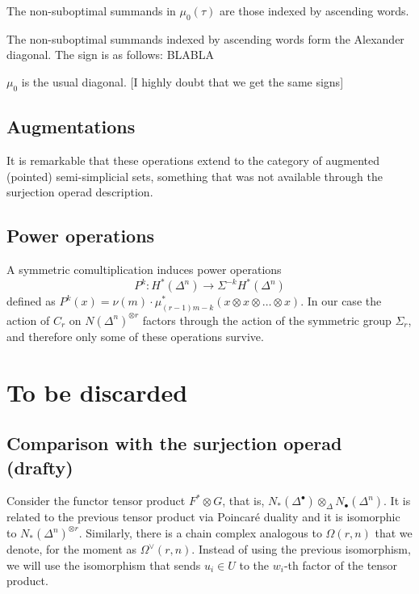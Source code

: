 \begin{proposition}
    The non-suboptimal summands in $\mu_0(\tau)$ are those indexed by ascending words.
\end{proposition}
\begin{proposition}
    The non-suboptimal summands indexed by ascending words form the Alexander diagonal. The sign is as follows: BLABLA 
\end{proposition}
\begin{corollary}
    $\mu_0$ is the usual diagonal. [I highly doubt that we get the same signs]
\end{corollary}




\subsection{Augmentations} It is remarkable that these operations extend to the category of augmented (pointed) semi-simplicial sets, something that was not available through the surjection operad description.  

\subsection{Power operations} A symmetric comultiplication induces power operations 
\[P^k\colon H^*(\Delta^n)\to \Sigma^{-k} H^*(\Delta^n)\]
defined as $P^k(x) =\nu(m)\cdot \mu_{(r-1)m-k}^*(x\otimes x\otimes\ldots\otimes x)$. In our case the action of $C_r$ on $N(\Delta^n)^{\otimes r}$ factors through the action of the symmetric group $\Sigma_r$, and therefore only some of these operations survive. 

\section{To be discarded}
\subsection{Comparison with the surjection operad (drafty)}

Consider the functor tensor product $F^*\otimes G$, that is, $N_*(\Delta^\bullet)\otimes_\Delta N_\bullet(\Delta^n)$. It is related to the previous tensor product via Poincaré duality and it is isomorphic to $N_*(\Delta^n)^{\otimes r}$. Similarly, there is a chain complex analogous to $\Omega(r,n)$ that we denote, for the moment as $\Omega^\vee(r,n)$. Instead of using the previous isomorphism, we will use the isomorphism that sends $u_i\in U$ to the $w_i$-th factor of the tensor product.

